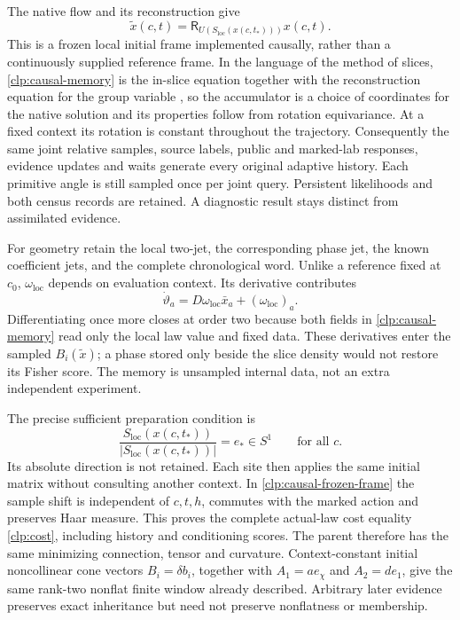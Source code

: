 The native flow and its reconstruction give
\begin{equation}
 \widetilde x(c,t)=\mathsf R_{U(S_{\mathrm{loc}}(x(c,t_*)))}x(c,t).
 \label{clp:causal-frozen-frame}
\end{equation}
This is a frozen local initial frame implemented causally, rather than a continuously supplied reference frame. In the language of the method of slices, \cref{clp:causal-memory} is the in-slice equation together with the reconstruction equation for the group variable \citep{RowleyMarsden2000}, so the accumulator is a choice of coordinates for the native solution and its properties follow from rotation equivariance. At a fixed context its rotation is constant throughout the trajectory. Consequently the same joint relative samples, source labels, public and marked-lab responses, evidence updates and waits generate every original adaptive history. Each primitive angle is still sampled once per joint query. Persistent likelihoods and both census records are retained. A diagnostic result stays distinct from assimilated evidence.

For geometry retain the local two-jet, the corresponding phase jet, the known coefficient jets, and the complete chronological word. Unlike a reference fixed at $c_0$, $\omega_{\mathrm{loc}}$ depends on evaluation context. Its derivative contributes
\begin{equation}
 \dot\vartheta_a=D\omega_{\mathrm{loc}}\bar x_a+(\omega_{\mathrm{loc}})_a.
 \label{clp:causal-phase-derivative}
\end{equation}
Differentiating once more closes at order two because both fields in \cref{clp:causal-memory} read only the local law value and fixed data. These derivatives enter the sampled $B_i(\widetilde x)$; a phase stored only beside the slice density would not restore its Fisher score. The memory is unsampled internal data, not an extra independent experiment.

The precise sufficient preparation condition is
\begin{equation}
 \frac{S_{\mathrm{loc}}(x(c,t_*))}{|S_{\mathrm{loc}}(x(c,t_*))|}
 =e_*\in S^1\qquad\text{for all }c.
 \label{clp:initial-coherence}
\end{equation}
Its absolute direction is not retained. Each site then applies the same initial matrix without consulting another context. In \cref{clp:causal-frozen-frame} the sample shift is independent of $c,t,h$, commutes with the marked action and preserves Haar measure. This proves the complete actual-law cost equality \cref{clp:cost}, including history and conditioning scores. The parent therefore has the same minimizing connection, tensor and curvature. Context-constant initial noncollinear cone vectors $B_i=\delta b_i$, together with $A_1=ae_\chi$ and $A_2=de_1$, give the same rank-two nonflat finite window already described. Arbitrary later evidence preserves exact inheritance but need not preserve nonflatness or membership.

